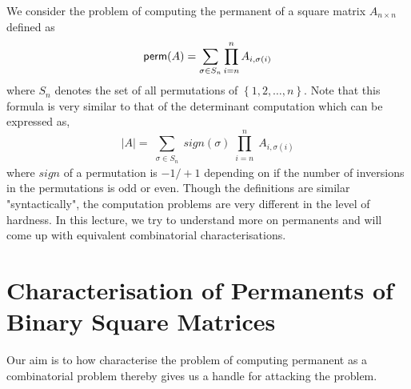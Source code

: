 
\newcommand{\countervalue}[1]{\arabic{#1} \addtocounter{#1}{1}}
\newcommand{\perm}{{\sf perm}}
We consider the problem of computing the permanent of a square matrix $A_{n
\times n}$ defined as
\[ \perm(A) = \sum_{\substack{\sigma \in S_n}} \prod_{\substack{i = n}}^n
A_{i, \sigma(i)} \]
where $S_n$ denotes the set of all permutations of $\left \{1, 2, \ldots, n
\right \}$. Note that this formula is very similar to that of the determinant
computation which can be expressed as,
\[ |A| = \sum_{\substack{\sigma \in S_n}} sign(\sigma) \prod_{\substack{i = n}}^n
A_{i, \sigma(i)} \]
where $sign$ of a permutation is $-1/+1$ depending on if the number of inversions
in the permutations is odd or even. 
Though the definitions are similar "syntactically", the computation problems are very different
in the level of hardness. In this lecture, we try to understand more on
permanents and will come up with equivalent combinatorial characterisations.

\section{Characterisation of Permanents of Binary Square Matrices}
Our aim is to how characterise the problem of computing permanent as a
combinatorial problem thereby gives us a handle for attacking the problem. 

